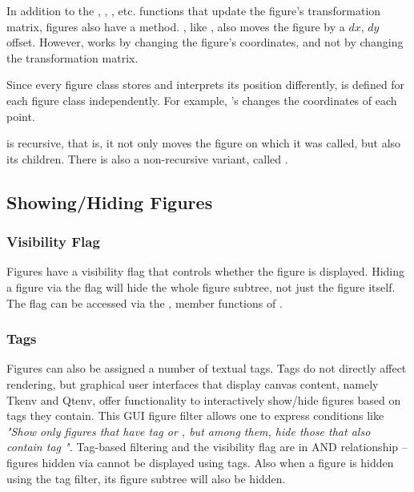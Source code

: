 In addition to the , , ,
etc. functions that update the figure's transformation matrix, figures also
have a  method. , like ,
also moves the figure by a $dx$, $dy$ offset. However,  works
by changing the figure's coordinates, and not by changing the
transformation matrix.

Since every figure class stores and interprets its position differently,
 is defined for each figure class independently. For example,
's  changes the coordinates of each point.

 is recursive, that is, it not only moves the figure on which
it was called, but also its children. There is also a non-recursive variant,
called .


\subsection{Showing/Hiding Figures}
\label{sec:graphics:showing-hiding-figures}

\subsubsection{Visibility Flag}
\label{sec:graphics:figure-visibility-flag}

Figures have a visibility flag that controls whether the figure is
displayed. Hiding a figure via the flag will hide the whole figure subtree,
not just the figure itself. The flag can be accessed via the
,  member functions of
.


\subsubsection{Tags}
\label{sec:graphics:figure-tags}

Figures can also be assigned a number of textual tags. Tags do not directly
affect rendering, but graphical user interfaces that display canvas
content, namely Tkenv and Qtenv, offer functionality to interactively
show/hide figures based on tags they contain. This GUI figure filter allows
one to express conditions like \textit{"Show only figures that have tag
 or , but among them, hide those that also contain
tag ".} Tag-based filtering and the visibility flag are in AND
relationship -- figures hidden via  cannot be
displayed using tags. Also when a figure is hidden using the tag filter,
its figure subtree will also be hidden.

